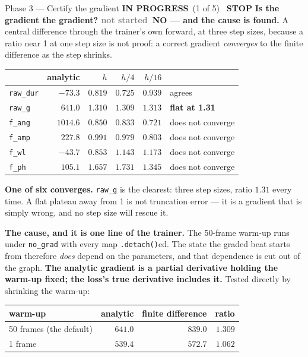 \documentclass[11pt,a4paper]{article}
\newcommand{\code}[1]{\texttt{#1}}
\newcommand{\ns}{\textcolor{grey}{not started}}
\newcommand{\prog}{\textcolor{warn}{\textbf{IN PROGRESS}}}
\newcommand{\stopp}{\textcolor{bad!30!white}{\textbf{STOP}}}
\begin{document}
\begin{phasebox}{Phase 3 --- Certify the gradient \hfill \prog\ (1 of 5) \ \stopp}
\textbf{Is the gradient the gradient? \ns\ NO --- and the cause is found.} A central difference
through the trainer's own forward, at three step sizes, because a ratio near 1 at one step size is
not proof: a correct gradient \emph{converges} to the finite difference as the step shrinks.

\begin{center}\small
\begin{tabular}{@{}l r r r r l@{}}
\toprule
& \textbf{analytic} & \textbf{$h$} & \textbf{$h/4$} & \textbf{$h/16$} & \\
\midrule
\code{raw\_dur} & $-73.3$ & $0.819$ & $0.725$ & $\mathbf{0.939}$ & agrees\\
\code{raw\_g} & $641.0$ & $1.310$ & $1.309$ & $1.313$ & \textbf{flat at 1.31}\\
\code{f\_ang} & $1014.6$ & $0.850$ & $0.833$ & $0.721$ & does not converge\\
\code{f\_amp} & $227.8$ & $0.991$ & $0.979$ & $0.803$ & does not converge\\
\code{f\_wl} & $-43.7$ & $0.853$ & $1.143$ & $1.173$ & does not converge\\
\code{f\_ph} & $105.1$ & $1.657$ & $1.731$ & $1.345$ & does not converge\\
\bottomrule
\end{tabular}
\end{center}

\noindent \textbf{One of six converges.} \code{raw\_g} is the clearest: three step sizes, ratio
$1.31$ every time. A flat plateau away from 1 is not truncation error --- it is a gradient that is
simply wrong, and no step size will rescue it.

\textbf{The cause, and it is one line of the trainer.} The 50-frame warm-up runs under
\code{no\_grad} with every map \code{.detach()}ed. The state the graded beat starts from therefore
\emph{does} depend on the parameters, and that dependence is cut out of the graph. \textbf{The
analytic gradient is a partial derivative holding the warm-up fixed; the loss's true derivative
includes it.} Tested directly by shrinking the warm-up:

\begin{center}\small
\begin{tabular}{@{}l r r r@{}}
\toprule
\textbf{warm-up} & \textbf{analytic} & \textbf{finite difference} & \textbf{ratio}\\
\midrule
50 frames (the default) & $641.0$ & $839.0$ & $1.309$\\
1 frame & $539.4$ & $572.7$ & $\mathbf{1.062}$\\
\bottomrule
\end{tabular}
\end{center}


\end{phasebox}
\end{document}
